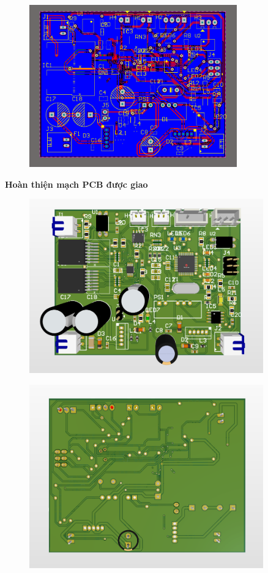 \begin{figure}[H]
    \centering
    \includegraphics[width=0.8\textwidth]{pictures/7k.png}
\end{figure}
\cleardoublepage
\textbf{Hoàn thiện mạch PCB được giao}
\begin{figure}[H]
    \centering
    \includegraphics[width=0.9\textwidth]{pictures/7l.png}
\end{figure}
\begin{figure}[H]
    \centering
    \includegraphics[width=0.9\textwidth]{pictures/7m.png}
\end{figure}
